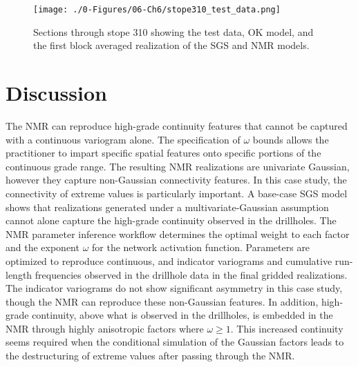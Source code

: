 
\begin{figure}[htb!]
    \centering
    \texttt{[image: ./0-Figures/06-Ch6/stope310\_test\_data.png]}
    \caption{Sections through stope 310 showing the test data, \gls{OK} model, and the first block averaged realization of the \gls{SGS} and \gls{NMR} models.}
    \label{fig:stope310_test_data}
\end{figure}



\FloatBarrier
\section{Discussion}
\label{sec:dicuss06}

The \gls{NMR} can reproduce high-grade continuity features that cannot be captured with a continuous variogram alone. The specification of $\omega$ bounds allows the practitioner to impart specific spatial features onto specific portions of the continuous grade range. The resulting \gls{NMR} realizations are univariate Gaussian, however they capture non-Gaussian connectivity features. In this case study, the connectivity of extreme values is particularly important. A base-case \gls{SGS} model shows that realizations generated under a multivariate-Gaussian assumption cannot alone capture the high-grade continuity observed in the drillholes. The \gls{NMR} parameter inference workflow determines the optimal weight to each factor and the exponent $\omega$ for the network activation function. Parameters are optimized to reproduce continuous, and indicator variograms and cumulative run-length frequencies observed in the drillhole data in the final gridded realizations. The indicator variograms do not show significant asymmetry in this case study, though the \gls{NMR} can reproduce these non-Gaussian features. In addition, high-grade continuity, above what is observed in the drillholes, is embedded in the \gls{NMR} through highly anisotropic factors where $\omega \ge 1$. This increased continuity seems required when the conditional simulation of the Gaussian factors leads to the destructuring of extreme values after passing through the \gls{NMR}.

